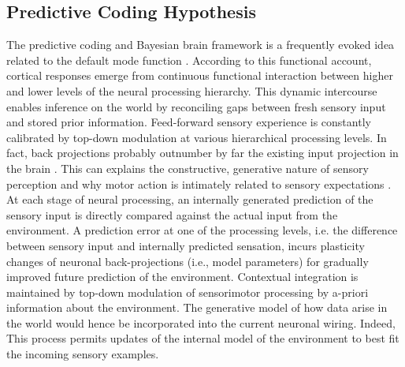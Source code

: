 \documentclass{article} %
\begin{document}
\subsection{Predictive Coding Hypothesis}
The predictive coding and Bayesian brain framework 
is a frequently evoked idea related to the default mode function
\cite{bar2007}.
According to this functional account,
cortical responses emerge from continuous functional interaction between
higher and lower levels of the neural processing hierarchy.
This dynamic intercourse enables inference on the world by reconciling
gaps between fresh sensory input and stored prior information. 
Feed-forward sensory experience is constantly calibrated by
top-down modulation at various hierarchical processing levels.
In fact,
back projections probably outnumber by far the existing input projection in the brain
\cite{salin1995corticocortical}.
This can explains the constructive, generative nature of sensory perception
\cite{friston2010free} and
why motor action is intimately related to sensory expectations
\cite{wolpert1995internal}.
At each stage of neural processing,
an internally generated prediction of the sensory input is
directly compared against the actual input from the environment.
A prediction error at one of the processing levels,
i.e. the difference between sensory input
and internally predicted sensation,
incurs plasticity changes of neuronal back-projections (i.e., model parameters)
for gradually improved future prediction of the environment.
Contextual integration is maintained by top-down modulation of sensorimotor
processing by a-priori information about the environment.
The generative model of how data arise in the
world would hence be incorporated into
the current neuronal wiring.
Indeed,
This process permits updates of the internal model of the environment
to best fit the incoming sensory examples.
\end{document}
